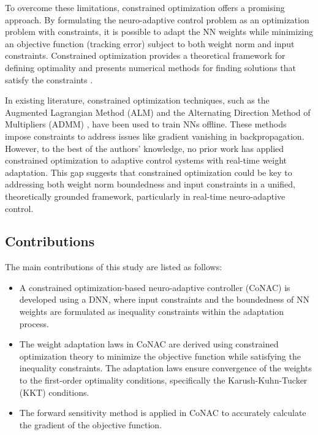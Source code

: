 \documentclass[final,5p,times,twocolumn,authoryear]{elsarticle}
\begin{document}
To overcome these limitations, constrained optimization offers a promising approach. 
By formulating the neuro-adaptive control problem as an optimization problem with constraints, it is possible to adapt the NN weights while minimizing an objective function (\eg tracking error) subject to both weight norm and input constraints. 
Constrained optimization provides a theoretical framework for defining optimality and presents numerical methods for finding solutions that satisfy the constraints \cite{Nocedal:2006aa}.

In existing literature, constrained optimization techniques, such as the Augmented Lagrangian Method (ALM) \cite{Evens:2021aa} and the Alternating Direction Method of Multipliers (ADMM) \cite{Wang:2019aa,Taylor:2016aa}, have been used to train NNs offline. 
These methods impose constraints to address issues like gradient vanishing in backpropagation. 
However, to the best of the authors' knowledge, no prior work has applied constrained optimization to adaptive control systems with real-time weight adaptation. 
This gap suggests that constrained optimization could be key to addressing both weight norm boundedness and input constraints in a unified, theoretically grounded framework, particularly in real-time neuro-adaptive control.

\subsection{Contributions}

The main contributions of this study are listed as follows:
\begin{itemize}
    \item A constrained optimization-based neuro-adaptive controller (CoNAC) is developed using a DNN, where input constraints and the boundedness of NN weights are formulated as inequality constraints within the adaptation process.
    \item The weight adaptation laws in CoNAC are derived using constrained optimization theory to minimize the objective function while satisfying the inequality constraints. The adaptation laws ensure convergence of the weights to the first-order optimality conditions, specifically the Karush-Kuhn-Tucker (KKT) conditions.
    \item The forward sensitivity method is applied in CoNAC to accurately calculate the gradient of the objective function. 
\end{itemize}
\end{document}
